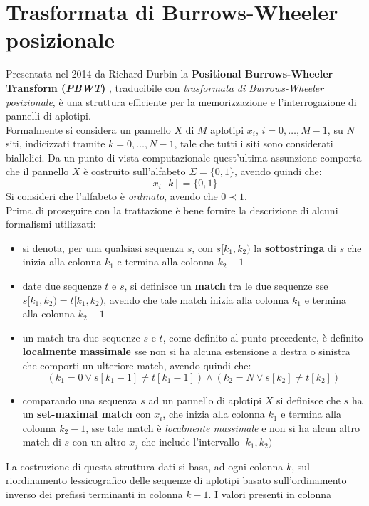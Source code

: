 \section{Trasformata di Burrows-Wheeler posizionale}
\label{secpbwt}
Presentata nel 2014 da Richard Durbin la \textbf{Positional Burrows-Wheeler
  Transform (\textit{PBWT})} \cite{pbwt}, traducibile con \textit{trasformata di
  Burrows-Wheeler posizionale}, è una struttura efficiente per la memorizzazione
e l'interrogazione di pannelli di aplotipi.\\
Formalmente si considera un pannello $X$ di $M$ aplotipi $x_i$, $i=0,\ldots,
M-1$, su $N$ siti, indicizzati tramite $k=0,\ldots, N-1$, tale che tutti i siti
sono considerati biallelici. Da un punto di vista computazionale quest'ultima
assunzione comporta che il pannello $X$ è costruito sull'alfabeto $\Sigma
=\{0,1\}$, avendo quindi che:
\[x_i[k]=\{0,1\}\]
Si consideri che l'alfabeto è \textit{ordinato}, avendo che $0\prec 1$.\\
Prima di proseguire con la trattazione è bene fornire la descrizione di alcuni
formalismi utilizzati:
\begin{itemize}
  \item si denota, per una qualsiasi sequenza $s$, con $s[k_1,k_2)$ la
  \textbf{sottostringa} di $s$ che inizia alla colonna $k_1$ e termina alla colonna
  $k_2-1$
  \item date due sequenze $t$ e $s$, si definisce un \textbf{match} tra le due
  sequenze sse $s[k_1,k_2)=t[k_1,k_2)$, avendo che tale match inizia alla
  colonna $k_1$ e termina alla colonna $k_2-1$
  \item un match tra due sequenze $s$ e $t$, come definito al punto precedente,
  è definito \textbf{localmente massimale} sse non si ha alcuna estensione a
  destra o sinistra che comporti un ulteriore match, avendo quindi che:
  \[(k_1=0\lor s[k_1-1]\neq t[k_1-1])\land (k_2=N\lor s[k_2]\neq t[k_2] )\]
  \item comparando una sequenza $s$ ad un pannello di aplotipi $X$ si definisce
  che $s$ ha un \textbf{set-maximal match} con $x_i$, che inizia alla
  colonna $k_1$ e termina alla colonna $k_2-1$, sse tale match è
  \textit{localmente massimale} e non si ha alcun altro match di $s$ con un
  altro $x_j$ che include l'intervallo $[k_1,k_2)$
\end{itemize}
La costruzione di questa struttura dati si basa, ad ogni colonna $k$, sul
riordinamento lessicografico delle sequenze di aplotipi basato sull'ordinamento
inverso dei prefissi terminanti in colonna $k-1$. I valori presenti in colonna
